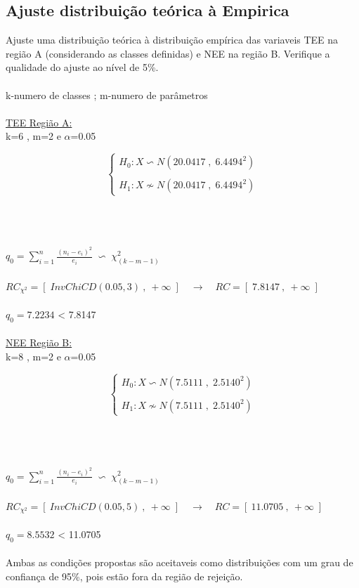 \subsection{Ajuste distribuição teórica à Empirica}
Ajuste uma distribuição teórica à distribuição empírica das variaveis TEE na região A (considerando as classes definidas) e NEE na região B. Verifique a qualidade do ajuste ao nível de 5\%.\\
\\
k-numero de classes \hspace{1cm}; m-numero de parâmetros
\\
\\
\hspace*{5cm} \underline{TEE Região A:} \\
k=6 , m=2 e $\alpha$=0.05 \\
\begin{minipage}[l]{0pt}
$$\left\lbrace\begin{array}{l}
H_0: X \backsim N (20.0417\;,\;6.4494^2) \\
\\
H_1: X \nsim N (20.0417\;,\;6.4494^2)
\end{array}\right.$$
\end{minipage}\\
\\
\\
$q_0=\sum_{i=1}^n \frac{(n_i-e_i)^2}{e_i} \;\backsim\; \chi_{(k-m-1)}^2$ \\
\\
$RC_{\chi^2}=\left[\; InvChiCD(0.05,3) \:,\: +\infty \; \right] \quad \rightarrow \quad RC=\left[\; 7.8147 \:,\: +\infty \; \right]$ \\
\\
$q_0=7.2234$ < 7.8147 \\
\\
\hspace*{5cm} \underline{NEE Região B:} \\
k=8 , m=2 e $\alpha$=0.05 \\
\begin{minipage}[l]{0pt}
$$\left\lbrace\begin{array}{l}
H_0: X \backsim N (7.5111\;,\;2.5140^2) \\
\\
H_1: X \nsim N (7.5111\;,\;2.5140^2)
\end{array}\right.$$
\end{minipage}\\
\\
\\
$q_0=\sum_{i=1}^n \frac{(n_i-e_i)^2}{e_i} \;\backsim\; \chi_{(k-m-1)}^2$ \\
\\
$RC_{\chi^2}=\left[ \: InvChiCD(0.05,5) \:,\: +\infty \; \right] \quad \rightarrow \quad RC=\left[ \: 11.0705 \:,\: +\infty \; \right]$ \\
\\
$q_0=8.5532$ < 11.0705 \\
\\
Ambas as condições propostas são aceitaveis como distribuições com um grau de confiança de 95\%, pois estão fora da região de rejeição.
